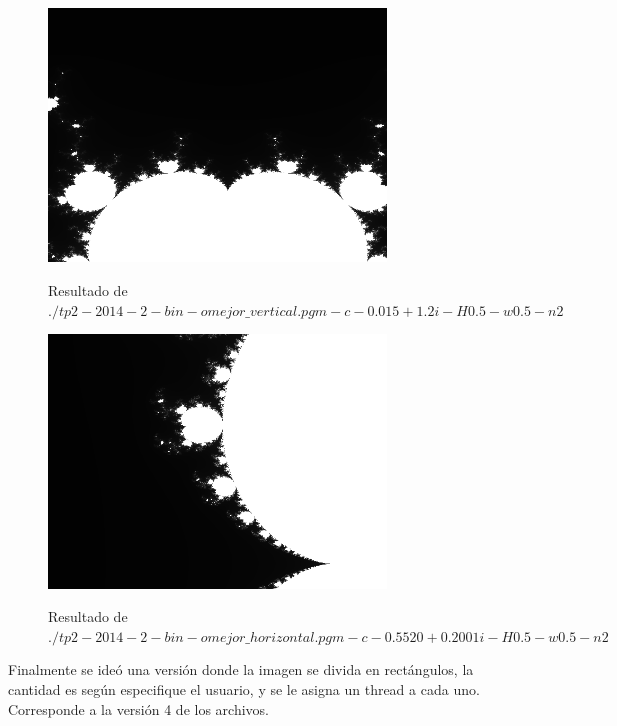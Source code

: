 \documentclass[a4paper,10pt]{article}
\begin{document}
\begin{figure}[H]
\begin{center}
\includegraphics[width=0.8\textwidth]{./mejorVertical.png}
\label{fig:def}
\caption{Resultado de $./tp2-2014-2-bin -o mejor\_vertical.pgm -c -0.015+1.2i -H 0.5 -w 0.5 -n 2$}
\end{center}
\end{figure}

\begin{figure}[H]
\begin{center}
\includegraphics[width=0.8\textwidth]{./mejorHorizontal.png}
\label{fig:def}
\caption{Resultado de $./tp2-2014-2-bin -o mejor\_horizontal.pgm -c -0.5520+0.2001i -H 0.5 -w 0.5 -n 2$}
\end{center}
\end{figure}



Finalmente se ideó una versión donde la imagen se divida en rectángulos, la cantidad es según especifique el usuario, y se le asigna un thread a cada uno.
Corresponde a la versión 4 de los archivos.
\end{document}
